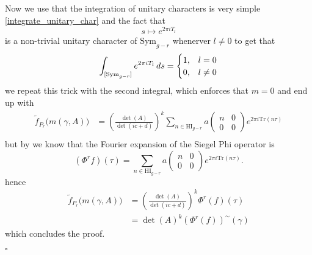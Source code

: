 Now we use that the integration of unitary characters is very simple \ref{integrate_unitary_char} and the fact that 
\[s\mapsto  e^{2\pi iT_l} \]
is a non-trivial unitary character of \(\mathrm{Sym}_{g-r}\) whenerver \(l\neq 0\) to get that 
\[\int^{}_{[\mathrm{Sym}_{g-r}]}  e^{2\pi iT_l}  \,ds = \begin{cases}
    1, & l=0 \\
    0, & l\neq 0
\end{cases}\]
we repeat this trick with the second integral, which enforces that \(m = 0\) and end up with 
\begin{align*}
    \tilde f_{P_r}\bigl(m(\gamma, A)\bigr)
     &=\left(\frac{\det(A)}{\det(ic + d)}\right)^{k} \sum_{n\in\mathrm{HI}_{g-r}} a\begin{pmatrix} n & 0\\ 0 & 0 \end{pmatrix}e^{2\pi i \mathrm{Tr} (n\tau)}\\
\end{align*}
but by \cite[3.5]{bruinier123ModularForms2008} we know that the Fourier expansion of the Siegel Phi operator is 
\[(\Phi^{r} f)(\tau) = \sum_{n\in\mathrm{HI}_{g-r}} a\begin{pmatrix} n & 0\\ 0 & 0 \end{pmatrix} e^{2\pi i\mathrm{Tr}(n \tau)}.\]
hence 
\begin{align*}
    \tilde f_{P_r}\bigl(m(\gamma, A)\bigr)
     &=\left(\frac{\det(A)}{\det(ic + d)}\right)^{k} \Phi^r(f)(\tau)\\
     &= \det(A)^k (\Phi^r(f))^{\sim}(\gamma)
\end{align*}
which concludes the proof.
\begin{FlushRight}
     \(\square\)
\end{FlushRight}